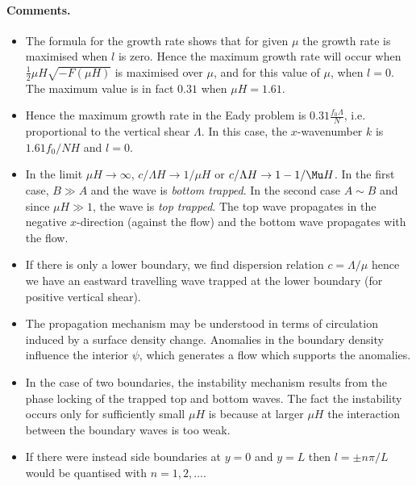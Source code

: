 \documentclass{jknotes}
\begin{document}
\paragraph{Comments.}
\begin{itemize}
	\item The formula for the growth rate shows that for given $\mu$ the
		growth rate is maximised when $l$ is zero. Hence the maximum growth
		rate will occur when $\frac{1}{2}\mu H \sqrt{-F(\mu H)}$ is maximised
		over $\mu$, and for this value of $\mu$, when $l = 0$. The maximum
		value is in fact $0.31$ when $\mu H = 1.61$.
	\item Hence the maximum growth rate in the Eady problem is $0.31 \frac{f_0
		\Lambda}{N}$, i.e. proportional to the vertical shear $\Lambda$. In
		this case, the $x$-wavenumber $k$ is $1.61 f_0/NH$ and $l = 0$.
	\item In the limit $\mu H \to \infty$, $c/\Lambda H \to 1/\mu H$ or
		$c/\Lambda H \to 1 - 1/\Mu H$. In the first case, $B \gg A$ and the
		wave is \emph{bottom trapped}. In the second case $A \sim B$ and since
		$\mu H \gg 1$, the wave is \emph{top trapped}. The top wave propagates
		in the negative $x$-direction (against the flow) and the bottom wave
		propagates with the flow.
	\item If there is only a lower boundary, we find dispersion relation $c =
		\Lambda/\mu$ hence we have an eastward travelling wave trapped at the
		lower boundary (for positive vertical shear). 
	\item The propagation mechanism may be understood in terms of circulation
		induced by a surface density change. Anomalies in the boundary density
		influence the interior $\psi$, which generates a flow which supports
		the anomalies.
	\item In the case of two boundaries, the instability mechanism results
		from the phase locking of the trapped top and bottom waves. The fact
		the instability occurs only for sufficiently small $\mu H$ is because
		at larger $\mu H$ the interaction between the boundary waves is too
		weak.
	\item If there were instead side boundaries at $y = 0$ and $y = L$ then $l
		= \pm n \pi /L$ would be quantised with $n = 1, 2, \dots$. 
\end{itemize}
\end{document}
